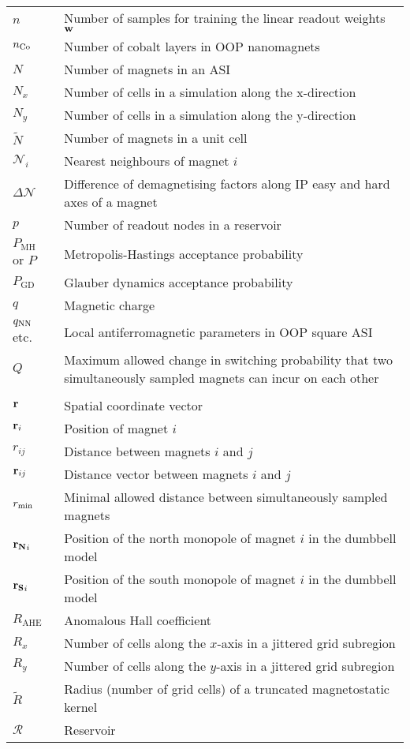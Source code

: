 \begin{longtable}[l]{p{60pt} p{350pt}}
	$n$ & Number of samples for training the linear readout weights $\boldsymbol{\mathbf{w}}$ \\
	$n_{\ce{Co}}$ & Number of cobalt layers in OOP nanomagnets \\
	$N$ & Number of magnets in an ASI \\
	$N_x$ & Number of cells in a simulation along the x-direction \\
	$N_y$ & Number of cells in a simulation along the y-direction \\
	$\widetilde{N}$ & Number of magnets in a unit cell \\
	$\mathcal{N}_i$ & Nearest neighbours of magnet $i$ \\
	$\Delta \mathcal{N}$ & Difference of demagnetising factors along IP easy and hard axes of a magnet\vspace{\whiteline}\\

	$p$ & Number of readout nodes in a reservoir \\
	$P_\mathrm{MH}$ or $P$ & Metropolis-Hastings acceptance probability \\
	$P_\mathrm{GD}$ & Glauber dynamics acceptance probability\vspace{\whiteline}\\

	$q$ & Magnetic charge \\
	$q_\mathrm{NN}$ etc. & Local antiferromagnetic parameters in OOP square ASI \\
	$Q$ & Maximum allowed change in switching probability that two simultaneously sampled magnets can incur on each other \\ &\vspace{\whiteline}\\

	$\boldsymbol{\mathbf{r}}$ & Spatial coordinate vector \\
	$\boldsymbol{\mathbf{r}}_i$ & Position of magnet $i$ \\
	$r_{ij}$ & Distance between magnets $i$ and $j$ \\
	$\boldsymbol{\mathbf{r}}_{ij}$ & Distance vector between magnets $i$ and $j$ \\
	$r_\mathrm{min}$ & Minimal allowed distance between simultaneously sampled magnets \\
	$\boldsymbol{\mathbf{r_N}}_i$ & Position of the north monopole of magnet $i$ in the dumbbell model \\
	$\boldsymbol{\mathbf{r_S}}_i$ & Position of the south monopole of magnet $i$ in the dumbbell model \\
	$R_\mathrm{AHE}$ & Anomalous Hall coefficient \\
	$R_x$ & Number of cells along the $x$-axis in a jittered grid subregion \\
	$R_y$ & Number of cells along the $y$-axis in a jittered grid subregion \\
	$\widetilde{R}$ & Radius (number of grid cells) of a truncated magnetostatic kernel \\
	$\mathcal{R}$ & Reservoir\vspace{\whiteline}\\


\end{longtable}
